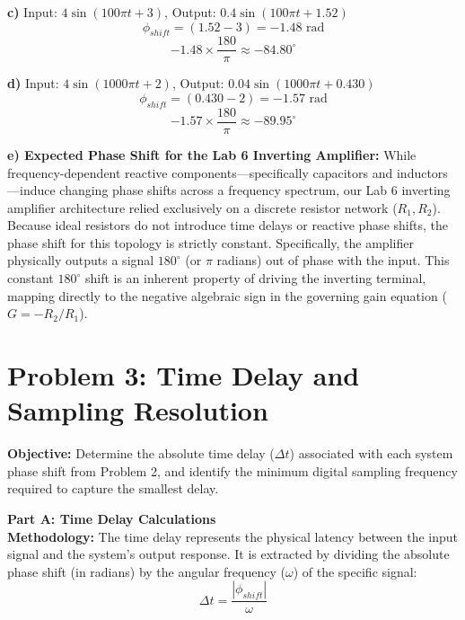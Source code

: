 \documentclass[11pt]{article}
\begin{document}
\textbf{c)} Input: $4\sin(100\pi t + 3)$, Output: $0.4\sin(100\pi t + 1.52)$
\[ \phi_{shift} = (1.52 - 3) = -1.48 \text{ rad} \]
\[ -1.48 \times \frac{180}{\pi} \approx \mathbf{-84.80^\circ} \]

\textbf{d)} Input: $4\sin(1000\pi t + 2)$, Output: $0.04\sin(1000\pi t + 0.430)$
\[ \phi_{shift} = (0.430 - 2) = -1.57 \text{ rad} \]
\[ -1.57 \times \frac{180}{\pi} \approx \mathbf{-89.95^\circ} \]

\textbf{e) Expected Phase Shift for the Lab 6 Inverting Amplifier:}
While frequency-dependent reactive components—specifically capacitors and inductors—induce changing phase shifts across a frequency spectrum, our Lab 6 inverting amplifier architecture relied exclusively on a discrete resistor network ($R_1, R_2$). Because ideal resistors do not introduce time delays or reactive phase shifts, the phase shift for this topology is strictly constant. Specifically, the amplifier physically outputs a signal $180^\circ$ (or $\pi$ radians) out of phase with the input. This constant $180^\circ$ shift is an inherent property of driving the inverting terminal, mapping directly to the negative algebraic sign in the governing gain equation ($G = -R_2/R_1$).

\section*{Problem 3: Time Delay and Sampling Resolution}

\textbf{Objective:} Determine the absolute time delay ($\Delta t$) associated with each system phase shift from Problem 2, and identify the minimum digital sampling frequency required to capture the smallest delay.

\textbf{Part A: Time Delay Calculations} \\
\textbf{Methodology:}
The time delay represents the physical latency between the input signal and the system's output response. It is extracted by dividing the absolute phase shift (in radians) by the angular frequency ($\omega$) of the specific signal:
\[ \Delta t = \frac{|\phi_{shift}|}{\omega} \]
\end{document}
